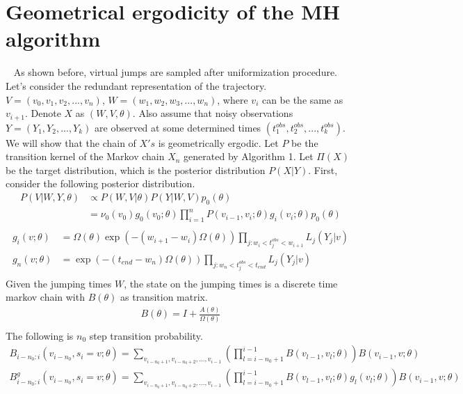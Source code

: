 \section{Geometrical ergodicity of the MH algorithm}~
As shown before, virtual jumps are sampled after uniformization procedure. Let's consider the redundant representation of the trajectory. $V = (v_0, v_1, v_2,..., v_n)$, $W = (w_1, w_2, w_3,..., w_n)$, where $v_i$ can be the same as $v_{i + 1}$. Denote $X$ as $(W, V, \theta)$. Also assume that noisy observations $Y = (Y_1, Y_2, ..., Y_k)$ are observed at some determined times $(t_1^{obs}, t_2^{obs}, ..., t_k^{obs})$. We will show that the chain of $X's$ is geometrically ergodic. Let $P$ be the transition kernel of the Markov chain $X_n$ generated by Algorithm 1. Let $\Pi(X)$ be the target distribution, which is the posterior distribution $P(X | Y)$. First, consider the following posterior distribution.
\begin{align*}
P(V | W, Y, \theta) &\propto  P(W, V | \theta) P(Y | W, V) p_0(\theta)\\
&= \nu_0(v_0)g_0(v_0; \theta)\prod_{i = 1}^n P(v_{i - 1}, v_i; \theta)g_i(v_i; \theta) p_0(\theta)\\
\end{align*}
\begin{align*}
g_i(v; \theta) &= \Omega(\theta) \exp(-(w_{i + 1} - w_i)\Omega(\theta)) \prod_{j: w_i < t_j^{obs} < w_{i + 1}} L_j(Y_j| v)\\
g_n(v; \theta) &= \exp(-(t_{end} - w_n)\Omega(\theta)) \prod_{j: w_n < t_j^{obs} < t_{end}} L_j(Y_j| v)\\
\end{align*}
Given the jumping times $W$, the state on the jumping times is a discrete time markov chain with $B(\theta)$ as transition matrix.
\begin{align*}
B(\theta) = I + \frac{A(\theta)}{\Omega(\theta)}\\
\end{align*}
The following is $n_0$ step transition probability.
\begin{align*}
B_{i - n_0 : i}(v_{i - n_0}, s_i = v; \theta) = \sum_{v_{i - n_0 + 1}, v_{i - n_0 + 2},...,v_{i - 1}} (\prod_{l = i - n_0 + 1}^{i - 1} B(v_{l - 1}, v_l; \theta))B(v_{i - 1}, v; \theta)\\
B_{i - n_0 : i}^{g}(v_{i - n_0}, s_i = v; \theta) = \sum_{v_{i - n_0 + 1}, v_{i - n_0 + 2},...,v_{i - 1}} (\prod_{l = i - n_0 + 1}^{i - 1} B(v_{l - 1}, v_l; \theta)g_l(v_l; \theta))B(v_{i - 1}, v; \theta)\\
\end{align*}

